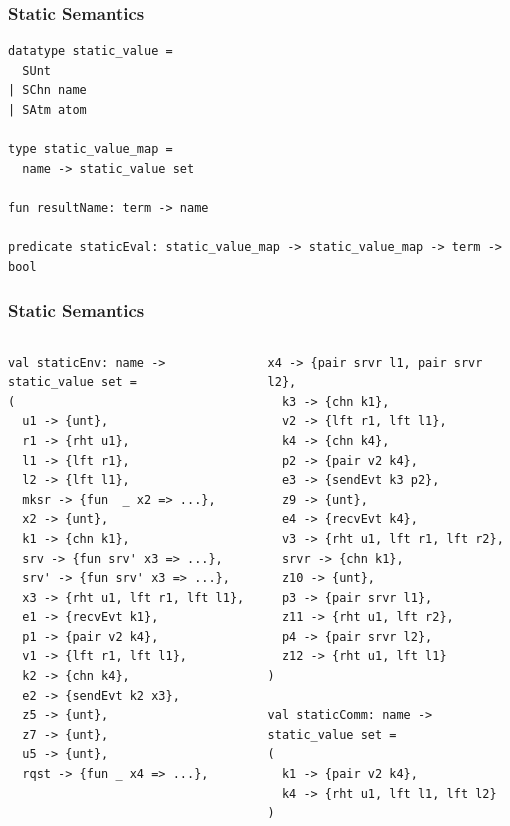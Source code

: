 \documentclass{beamer}
\begin{document}
\begin{frame}[fragile]
	\frametitle{Static Semantics}
\begin{lstlisting}[language=logic, mathescape]
datatype static_value =
  SUnt
| SChn name
| SAtm atom 

type static_value_map =
  name -> static_value set

fun resultName: term -> name

predicate staticEval: static_value_map -> static_value_map -> term -> bool
\end{lstlisting}
\end{frame}

\begin{frame}[fragile]
	\frametitle{Static Semantics}
\begin{columns}
\begin{column}{0.5\textwidth}
\begin{lstlisting}[language=sugar_lang, mathescape]
val staticEnv: name -> static_value set =
(
  u1 -> {unt},
  r1 -> {rht u1},
  l1 -> {lft r1},
  l2 -> {lft l1},
  mksr -> {fun  _ x2 => ...},
  x2 -> {unt},
  k1 -> {chn k1},
  srv -> {fun srv' x3 => ...},
  srv' -> {fun srv' x3 => ...},
  x3 -> {rht u1, lft r1, lft l1},
  e1 -> {recvEvt k1},
  p1 -> {pair v2 k4},
  v1 -> {lft r1, lft l1},
  k2 -> {chn k4},
  e2 -> {sendEvt k2 x3},
  z5 -> {unt},
  z7 -> {unt},
  u5 -> {unt},
  rqst -> {fun _ x4 => ...},
\end{lstlisting}
\end{column}

\begin{column}{0.5\textwidth}
\begin{lstlisting}[language=sugar_lang, mathescape]
  x4 -> {pair srvr l1, pair srvr l2},
  k3 -> {chn k1},
  v2 -> {lft r1, lft l1},
  k4 -> {chn k4},
  p2 -> {pair v2 k4},
  e3 -> {sendEvt k3 p2},
  z9 -> {unt},
  e4 -> {recvEvt k4},
  v3 -> {rht u1, lft r1, lft r2},
  srvr -> {chn k1},
  z10 -> {unt},
  p3 -> {pair srvr l1},
  z11 -> {rht u1, lft r2},
  p4 -> {pair srvr l2},
  z12 -> {rht u1, lft l1}
)

val staticComm: name -> static_value set =
(
  k1 -> {pair v2 k4},
  k4 -> {rht u1, lft l1, lft l2}
)
\end{lstlisting}
\end{column}
\end{columns}
\end{frame}
\end{document}
